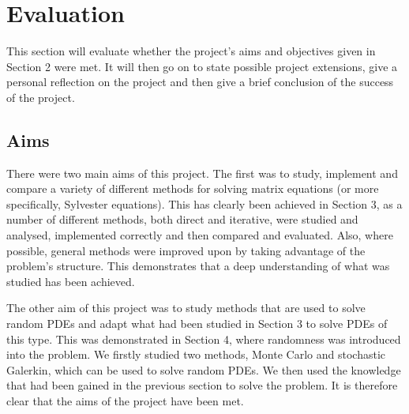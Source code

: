 \documentclass[11pt]{article}
\numberwithin{equation}{section}
\begin{document}
\newpage

\section{Evaluation}
This section will evaluate whether the project's aims and objectives given in Section 2 were met. It will then go on to state possible project extensions, give a personal reflection on the project and then give a brief conclusion of the success of the project.

\subsection{Aims}
There were two main aims of this project. The first was to study, implement and compare a variety of different methods for solving matrix equations (or more specifically, Sylvester equations). This has clearly been achieved in Section 3, as a number of different methods, both direct and iterative, were studied and analysed, implemented correctly and then compared and evaluated. Also, where possible, general methods were improved upon by taking advantage of the problem's structure. This demonstrates that a deep understanding of what was studied has been achieved.

The other aim of this project was to study methods that are used to solve random PDEs and adapt what had been studied in Section 3 to solve PDEs of this type. This was demonstrated in Section 4, where randomness was introduced into the problem. We firstly studied two methods, Monte Carlo and stochastic Galerkin, which can be used to solve random PDEs. We then used the knowledge that had been gained in the previous section to solve the problem. It is therefore clear that the aims of the project have been met.
\end{document}
